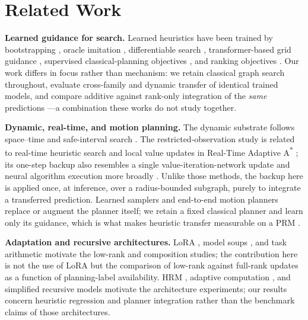 \documentclass[letterpaper]{article} %
\begin{document}
\section{Related Work}

\textbf{Learned guidance for search.} Learned heuristics have been trained by bootstrapping \citep{arfaee2011bootstrap}, oracle imitation \citep{bhardwaj2017sail}, differentiable search \citep{yonetani2021neuralastar}, transformer-based grid guidance \citep{kirilenko2023transpath}, supervised classical-planning objectives \citep{ferber2020neural}, and ranking objectives \citep{chrestien2023rank}. Our work differs in focus rather than mechanism: we retain classical graph search throughout, evaluate cross-family and dynamic transfer of identical trained models, and compare additive against rank-only integration of the \emph{same} predictions \citep{pohl1970,pearl1982semiadmissible,aine2016mha}---a combination these works do not study together.

\textbf{Dynamic, real-time, and motion planning.} The dynamic substrate follows space--time and safe-interval search \citep{silver2005cooperative,phillips2011sipp}. The restricted-observation study is related to real-time heuristic search \citep{korf1990rta} and local value updates in Real-Time Adaptive A\textsuperscript{*} \citep{koenig2006rtaa}; its one-step backup also resembles a single value-iteration-network update \citep{tamar2016vin,lee2018gppn} and neural algorithm execution more broadly \citep{velickovic2021nar}. Unlike those methods, the backup here is applied once, at inference, over a radius-bounded subgraph, purely to integrate a transferred prediction. Learned samplers and end-to-end motion planners \citep{ichter2018sampling,qureshi2019mpnet} replace or augment the planner itself; we retain a fixed classical planner and learn only its guidance, which is what makes heuristic transfer measurable on a PRM \citep{kavraki1996prm}.

\textbf{Adaptation and recursive architectures.} LoRA \citep{hu2021lora}, model soups \citep{wortsman2022soups}, and task arithmetic \citep{ilharco2022task} motivate the low-rank and composition studies; the contribution here is not the use of LoRA but the comparison of low-rank against full-rank updates as a function of planning-label availability. HRM \citep{wang2025hrm}, adaptive computation \citep{graves2016act,banino2021pondernet}, and simplified recursive models \citep{jolicoeur2025trm} motivate the architecture experiments; our results concern heuristic regression and planner integration rather than the benchmark claims of those architectures.
\end{document}
